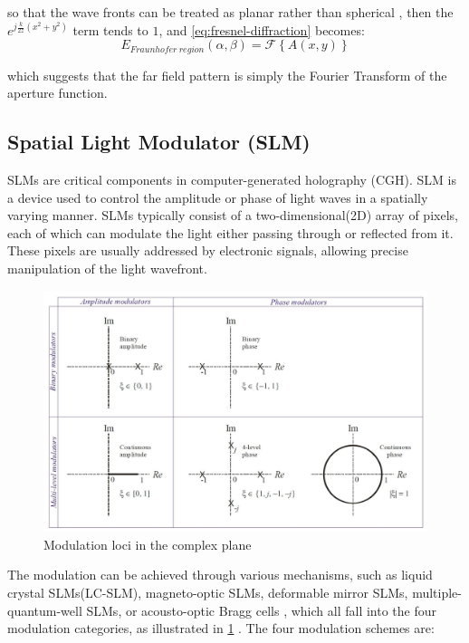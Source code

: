 so that the wave fronts can be treated as planar rather than spherical \cite{Daintith2009}, then the $e^{j\frac{k}{2z}(x^2+y^2)}$ term tends to $1$, and \cref{eq:fresnel-diffraction} becomes:
\begin{equation}
  E_{Fraunhofer\ region}(\alpha, \beta) = \mathcal{F} \left\{A(x,y)\right\}
\end{equation}

which suggests that the far field pattern is simply the Fourier Transform of the aperture function.


\subsection{Spatial Light Modulator (SLM)} \label{sec:SLM}
SLMs are critical components in computer-generated holography (CGH). SLM is a device used to control the amplitude or phase of light waves in a spatially varying manner. SLMs typically consist of a two-dimensional(2D) array of pixels, each of which can modulate the light either passing through or reflected from it. These pixels are usually addressed by electronic signals, allowing precise manipulation of the light wavefront.

\begin{figure}[H]
  \centering
  \includegraphics[width=1.0\textwidth]{modulation_loci.jpg}
  \caption{Modulation loci in the complex plane \cite{Cable2006}} \label{fig:modulation_loci}
\end{figure}

The modulation can be achieved through various mechanisms, such as liquid crystal SLMs(LC-SLM), magneto-optic SLMs, deformable mirror SLMs, multiple-quantum-well SLMs, or acousto-optic Bragg cells \cite{Goodman2017}, which all fall into the four modulation categories, as illustrated in \cref{fig:modulation_loci} \cite{Cable2006}. The four modulation schemes are:

